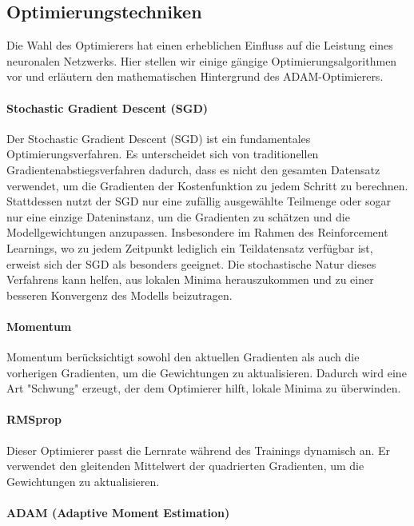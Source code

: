 \subsection{Optimierungstechniken}

Die Wahl des Optimierers hat einen erheblichen Einfluss auf die Leistung eines neuronalen Netzwerks. Hier stellen wir einige gängige Optimierungsalgorithmen vor und erläutern den mathematischen Hintergrund des ADAM-Optimierers.

\paragraph{Stochastic Gradient Descent (SGD)}
\label{sec: Stochastisch Gredient Descent}

Der Stochastic Gradient Descent (SGD) ist ein fundamentales Optimierungsverfahren. 
Es unterscheidet sich von traditionellen Gradientenabstiegsverfahren dadurch, dass es nicht den gesamten Datensatz verwendet, um die Gradienten der Kostenfunktion zu jedem Schritt zu berechnen. 
Stattdessen nutzt der SGD nur eine zufällig ausgewählte Teilmenge oder sogar nur eine einzige Dateninstanz, um die Gradienten zu schätzen und die Modellgewichtungen anzupassen. 
Insbesondere im Rahmen des Reinforcement Learnings, wo zu jedem Zeitpunkt lediglich ein Teildatensatz verfügbar ist, erweist sich der SGD als besonders geeignet. 
Die stochastische Natur dieses Verfahrens kann helfen, aus lokalen Minima herauszukommen und zu einer besseren Konvergenz des Modells beizutragen.
\cite{klein_abbeel_cs188}

\paragraph{Momentum}

Momentum berücksichtigt sowohl den aktuellen Gradienten als auch die vorherigen Gradienten, um die Gewichtungen zu aktualisieren. Dadurch wird eine Art "Schwung" erzeugt, der dem Optimierer hilft, lokale Minima zu überwinden.

\paragraph{RMSprop}

Dieser Optimierer passt die Lernrate während des Trainings dynamisch an. Er verwendet den gleitenden Mittelwert der quadrierten Gradienten, um die Gewichtungen zu aktualisieren.

\paragraph{ADAM (Adaptive Moment Estimation)}
\label{sec: adam optimizer}

